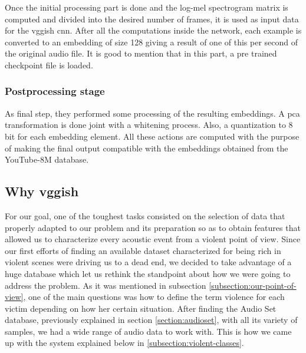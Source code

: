 	Once the initial processing part is done and the log-mel spectrogram matrix is computed and divided into the desired number of frames, it is used as input data for the \acrshort{vgg}ish \acrshort{cnn}. After all the computations inside the network, each example is converted to an embedding of size 128 giving a result of one of this per second of the original audio file. It is good to mention that in this part, a pre trained checkpoint file is loaded.
	
	\subsubsection*{Postprocessing stage}
	
	As final step, they performed some processing of the resulting embeddings. A \acrfull{pca} transformation is done joint with a whitening process. Also, a quantization to 8 bit for each embedding element. All these actions are computed with the purpose of making the final output compatible with the embeddings obtained from the YouTube-8M database.
	
	
\subsection{Why \acrshort{vgg}ish}

	For our goal, one of the toughest tasks consisted on the selection of data that properly adapted to our problem and its preparation so as to obtain features that allowed us to characterize every acoustic event from a violent point of view. Since our first efforts of finding an available dataset characterized for being rich in violent scenes were driving us to a dead end, we decided to take advantage of a huge database which let us rethink the standpoint about how we were going to address the problem. As it was mentioned in subsection \ref{subsection:our-point-of-view}, one of the main questions was how to define the term violence for each victim depending on how her certain situation. After finding the Audio Set database, previously explained in section \ref{section:audioset}, with all its variety of samples, we had a wide range of audio data to work with. This is how we came up with the system explained below in \ref{subsection:violent-classes}.
	
